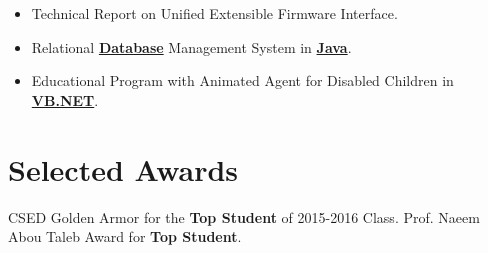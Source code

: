 \documentclass[letterpaper]{twentysecondcv} %
\begin{document}
\begin{itemize}
    \item{Technical Report on Unified Extensible Firmware Interface.}
    \item{Relational \textbf{\underline{Database}} Management System in \textbf{\underline{Java}}.}
    \item{Educational Program with Animated Agent for Disabled Children in \textbf{\underline{VB.NET}}.}
\end{itemize}


\section{Selected Awards}

\begin{twentyshort}
	       {CSED Golden Armor for the \textbf{Top Student} of 2015-2016 Class.}
	       {Prof. Naeem Abou Taleb Award for \textbf{Top Student}.}
\end{twentyshort}

\end{document}
